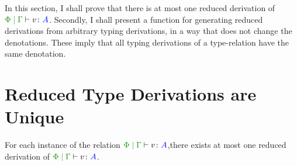 \documentclass{report}
\begin{document}
    In this section, I shall prove that there is at most one reduced derivation of $\gpetyperelation{v}{A}$. Secondly, I shall present a function for generating reduced derivations from arbitrary typing derivations, in a way that does not change the denotations. These imply that all typing derivations of a type-relation have the same denotation.
    
    \section{Reduced Type Derivations are Unique}

\begin{theorem}
        For each instance of the relation $\gpetyperelation{v}{A}$,there exists at most one reduced derivation of  $\gpetyperelation{v}{A}$. 
\end{theorem}
    
\end{document}
